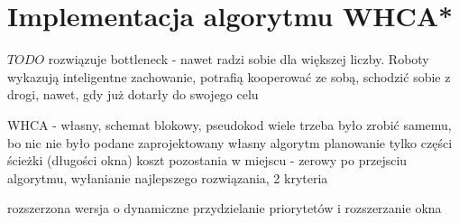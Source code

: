\section{Implementacja algorytmu WHCA*}
\label{ch:alg-whca}

$TODO$ rozwiązuje bottleneck - nawet radzi sobie dla większej liczby.
Roboty wykazują inteligentne zachowanie, potrafią kooperować ze sobą, schodzić sobie z drogi, nawet, gdy już dotarły do swojego celu

WHCA - własny, schemat blokowy, pseudokod
wiele trzeba było zrobić samemu, bo nic nie było podane
zaprojektowany własny algorytm
planowanie tylko części ścieżki (długości okna)
koszt pozostania w miejscu - zerowy
po przejsciu algorytmu, wyłanianie najlepszego rozwiązania, 2 kryteria

rozszerzona wersja o dynamiczne przydzielanie priorytetów i rozszerzanie okna